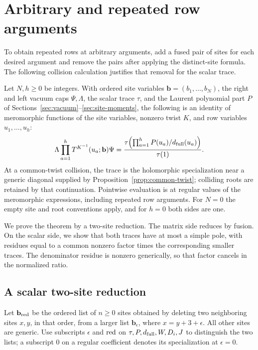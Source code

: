 \section{Arbitrary and repeated row arguments}\label{sec:repeated-moments}

To obtain repeated rows at arbitrary arguments, add a fused pair of sites for each desired argument and remove the pairs after applying the distinct-site formula. The following collision calculation justifies that removal for the scalar trace.

\begin{theorem}\label{thm:row-moments}
Let $N,h\ge0$ be integers. With ordered site variables $\mathbf b=(b_1,\ldots,b_N)$, the right and left vacuum caps $\Psi,\Lambda$, the scalar trace $\tau$, and the Laurent polynomial part $P$ of Sections~\ref{sec:vacuum}--\ref{sec:site-moments}, the following is an identity of meromorphic functions of the site variables, nonzero twist $K$, and row variables $u_1,\ldots,u_h$:
\begin{equation}\label{eq:all-row-moments}
 \Lambda\prod_{a=1}^h T^{K^{-1}}(u_a;\mathbf b)\Psi
 =\frac{\tau\!\left(\prod_{a=1}^h P(u_a)/d_{\rm full}(u_a)\right)}{\tau(1)}.
\end{equation}
At a common-twist collision, the trace is the holomorphic specialization near a generic diagonal supplied by Proposition~\ref{prop:common-twist}; colliding roots are retained by that continuation. Pointwise evaluation is at regular values of the meromorphic expressions, including repeated row arguments. For $N=0$ the empty site and root conventions apply, and for $h=0$ both sides are one.
\end{theorem}

We prove the theorem by a two-site reduction. The matrix side reduces by fusion. On the scalar side, we show that both traces have at most a simple pole, with residues equal to a common nonzero factor times the corresponding smaller traces. The denominator residue is nonzero generically, so that factor cancels in the normalized ratio.

\subsection{A scalar two-site reduction}

Let $\mathbf b_{\rm red}$ be the ordered list of $n\ge0$ sites obtained by deleting two neighboring sites $x,y$, in that order, from a larger list $\mathbf b_\epsilon$, where $x=y+3+\epsilon$. All other sites are generic. Use subscripts $\epsilon$ and ${\rm red}$ on $\tau,P,d_{\rm full},W,D_i,J$ to distinguish the two lists; a subscript $0$ on a regular coefficient denotes its specialization at $\epsilon=0$.

